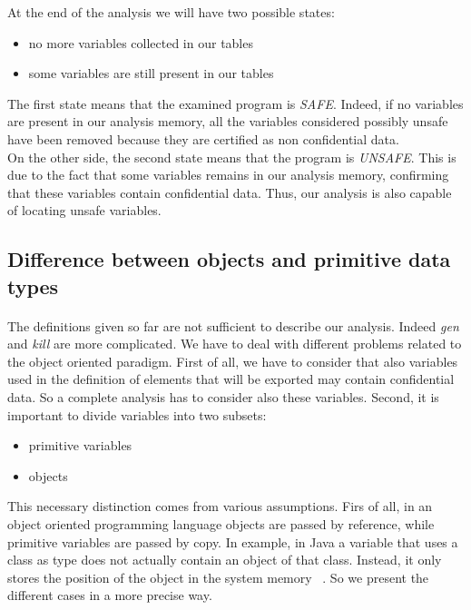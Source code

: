 \documentclass[letterpaper,twocolumn,10pt]{article}
\begin{document}
At the end of the analysis we will have two possible states:
\begin{itemize}
\item no more variables collected in our tables
\item some variables are still present in our tables
\end{itemize}
The first state means that the examined program is \emph{SAFE}. Indeed, if no variables are present in our analysis memory, all the variables considered possibly unsafe have been removed because they are certified as non confidential data.\\
On the other side, the second state means that the program is \emph{UNSAFE}. This is due to the fact that some variables remains in our analysis memory, confirming that these variables contain confidential data. Thus, our analysis is also capable of locating unsafe variables.

\subsection{Difference between objects and primitive data types}
\paragraph{}
The definitions given so far are not sufficient to describe our analysis. Indeed \emph{gen} and \emph{kill} are more complicated. We have to deal with different problems related to the object oriented paradigm. First of all, we have to consider that also variables used in the definition of elements that will be exported may contain confidential data. So a complete analysis has to consider also these variables.
Second, it is important to divide variables into two subsets:
\begin{itemize}
\item primitive variables
\item objects
\end{itemize}
This necessary distinction comes from various assumptions. Firs of all, in an object oriented programming language objects are passed by reference, while primitive variables are passed by copy. In example, in Java a variable that uses a class as type does not actually contain an object of that class. Instead, it only stores the position of the object in the system memory ~\cite{Horstmann:2008:BJ:1796502}. So we present the different cases in a more precise way.
\end{document}
